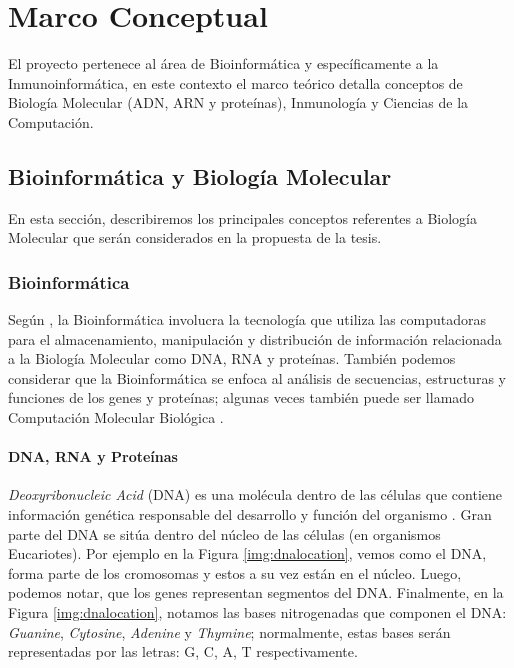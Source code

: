 \chapter{Marco Conceptual}
\label{cap:marcoteorico}


El proyecto pertenece al área de Bioinformática y específicamente a la Inmunoinformática, en este contexto el marco teórico detalla conceptos de Biología Molecular (ADN, ARN y proteínas), Inmunología y Ciencias de la Computación. 

\section{Bioinformática y Biología Molecular }

En esta sección, describiremos los principales conceptos referentes a Biología Molecular que serán considerados en la propuesta de la tesis.

\subsection{Bioinformática}

Según \cite{luscombe2001bioinformatics}, la Bioinformática involucra la tecnología que utiliza las computadoras para el almacenamiento, manipulación y distribución de información relacionada a la Biología Molecular como DNA, RNA y proteínas. También podemos considerar que la Bioinformática se enfoca al análisis de secuencias, estructuras y funciones de los genes y proteínas; algunas veces también puede ser llamado Computación Molecular Biológica \citep{xiong2006essential}.


\subsubsection{DNA, RNA y Proteínas}

\textit{Deoxyribonucleic Acid} (DNA) es una molécula dentro de las células que contiene información genética responsable del desarrollo y función del organismo \citep{NCIdictionary2022}. Gran parte del DNA se sitúa dentro del núcleo de las células (en organismos Eucariotes). Por ejemplo en la Figura \ref{img:dnalocation}, vemos como el DNA, forma parte de los cromosomas y estos a su vez están en el núcleo. Luego, podemos notar, que los genes representan segmentos del DNA. Finalmente, en la Figura \ref{img:dnalocation}, notamos las bases nitrogenadas que componen el DNA: \textit{Guanine}, \textit{Cytosine}, \textit{Adenine} y \textit{Thymine}; normalmente, estas bases serán representadas por las letras: G, C, A, T respectivamente.

